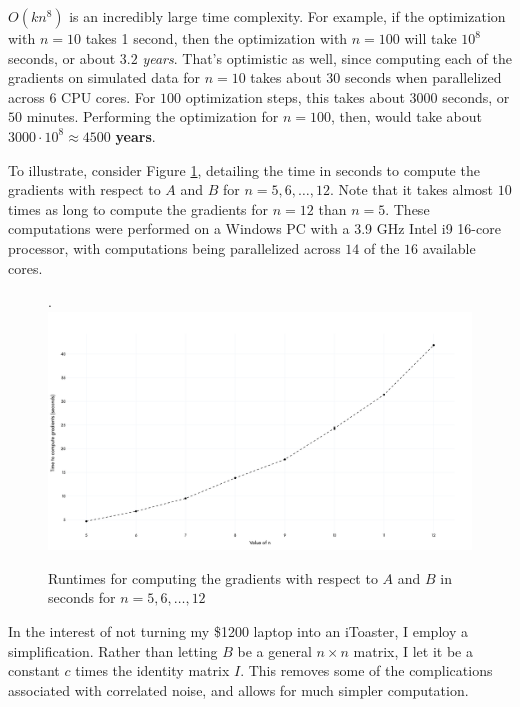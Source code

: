 \documentclass[12pt]{article}
\theoremstyle{definition}
\begin{document}
$O(kn^8)$ is an incredibly large time complexity. For example, if the optimization with $n=10$ takes 1 second, then the optimization with $n=100$ will take $10^8$ seconds, or about $3.2$ \textit{years}. That's optimistic as well, since computing each of the gradients on simulated data for $n=10$ takes about $30$ seconds when parallelized across 6 CPU cores. For $100$ optimization steps, this takes about $3000$ seconds, or $50$ minutes. Performing the optimization for $n=100$, then, would take about $3000 \cdot 10^8 \approx 4500$ \textbf{years}.

To illustrate, consider Figure \ref{fig:runtime}, detailing the time in seconds to compute the gradients with respect to $A$ and $B$ for $n = 5, 6, \ldots, 12$. Note that it takes almost $10$ times as long to compute the gradients for $n=12$ than $n=5$. These computations were performed on a Windows PC with a 3.9 GHz Intel i9 16-core processor, with computations being parallelized across $14$ of the $16$ available cores.

\begin{figure}[hbt!]
    \vspace{0.1in}
    \par
    \begin{center}
    \caption{Runtimes for computing the gradients with respect to $A$ and $B$ in seconds for $n = 5, 6, \ldots, 12$}.
    \label{fig:runtime}
    \includegraphics[scale=0.11]{Figures/runtime.png}
    \end{center}
    \par
    \vspace{-0.25in}
    \medskip
\end{figure}

In the interest of not turning my \$1200 laptop into an iToaster, I employ a simplification. Rather than letting $B$ be a general $n \times n$ matrix, I let it be a constant $c$ times the identity matrix $I$. This removes some of the complications associated with correlated noise, and allows for much simpler computation. 
\end{document}
